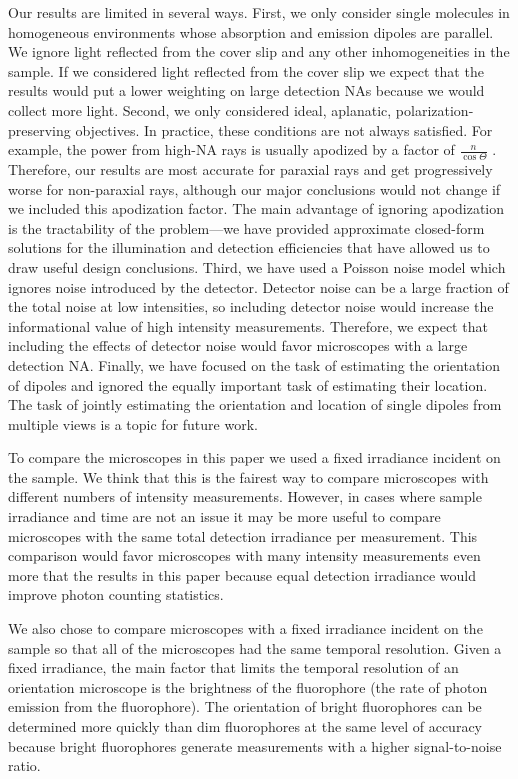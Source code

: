 \documentclass[10pt]{article}
\begin{document}
Our results are limited in several ways. First, we only consider single
molecules in homogeneous environments whose absorption and emission dipoles are
parallel. We ignore light reflected from the cover slip and any other
inhomogeneities in the sample. If we considered light reflected from the cover
slip we expect that the results would put a lower weighting on large detection
NAs because we would collect more light. Second, we only considered ideal,
aplanatic, polarization-preserving objectives. In practice, these conditions are
not always satisfied. For example, the power from high-NA rays is usually
apodized by a factor of $\frac{n}{\cos\Theta}$ \cite{nov2006}. Therefore, our
results are most accurate for paraxial rays and get progressively worse for
non-paraxial rays, although our major conclusions would not change if we
included this apodization factor. The main advantage of ignoring apodization is
the tractability of the problem---we have provided approximate closed-form
solutions for the illumination and detection efficiencies that have allowed us
to draw useful design conclusions. Third, we have used a Poisson noise model
which ignores noise introduced by the detector. Detector noise can be a large
fraction of the total noise at low intensities, so including detector noise
would increase the informational value of high intensity
measurements. Therefore, we expect that including the effects of detector noise
would favor microscopes with a large detection NA. Finally, we have focused on
the task of estimating the orientation of dipoles and ignored the equally
important task of estimating their location. The task of jointly estimating the
orientation and location of single dipoles from multiple views is a topic for
future work.

To compare the microscopes in this paper we used a fixed irradiance incident on
the sample. We think that this is the fairest way to compare microscopes with
different numbers of intensity measurements. However, in cases where sample
irradiance and time are not an issue it may be more useful to compare
microscopes with the same total detection irradiance per measurement. This
comparison would favor microscopes with many intensity measurements even more
that the results in this paper because equal detection irradiance would improve
photon counting statistics.

\hypertarget{temporal}{{\color{urlblue} We also chose to compare microscopes
    with a fixed irradiance incident on the sample so that all of the
    microscopes had the same temporal resolution. Given a fixed irradiance, the
    main factor that limits the temporal resolution of an orientation microscope
    is the brightness of the fluorophore (the rate of photon emission from the
    fluorophore). The orientation of bright fluorophores can be determined more
    quickly than dim fluorophores at the same level of accuracy because bright
    fluorophores generate measurements with a higher signal-to-noise ratio.}}
\end{document}
